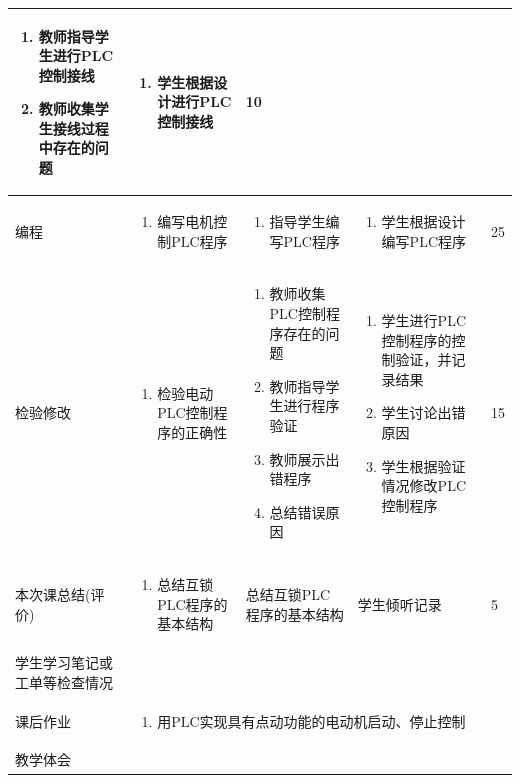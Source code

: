 {\begin{landscape}
\begin{longtable}{|m{10mm}|m{50mm}|m{50mm}|m{50mm}|m{15mm}|}
\begin{enumerate}
\item 教师指导学生进行PLC控制接线
\item 教师收集学生接线过程中存在的问题
\end{enumerate} &\begin{enumerate}
\item 学生根据设计进行PLC控制接线
\end{enumerate} &10 \\\hline
编程&
\begin{enumerate}
\item 编写电机控制PLC程序
\end{enumerate} &\begin{enumerate}
\item 指导学生编写PLC程序
\end{enumerate} &\begin{enumerate}
\item 学生根据设计编写PLC程序
\end{enumerate} &25 \\\hline
\centering 检验修改&\begin{enumerate}
\item 检验电动PLC控制程序的正确性
\end{enumerate}&\begin{enumerate}
\item 教师收集PLC控制程序存在的问题
\item 教师指导学生进行程序验证
\item 教师展示出错程序
\item 总结错误原因
\end{enumerate}&\begin{enumerate}
\item 学生进行PLC控制程序的控制验证，并记录结果
\item 学生讨论出错原因
\item 学生根据验证情况修改PLC控制程序
\end{enumerate}&15 \\\hline
\centering 本次课总结(评价)&\begin{enumerate}
\item 总结互锁PLC程序的基本结构 
\end{enumerate}&总结互锁PLC程序的基本结构  &学生倾听记录 &5 \\\hline
\centering 学生学习笔记或工单等检查情况&\multicolumn{4}{m{165mm}|}{\quad}\\\hline
\centering 课后作业&\multicolumn{4}{m{165mm}|}{\begin{enumerate}
\item 用PLC实现具有点动功能的电动机启动、停止控制
\end{enumerate}}\\\hline
\centering 教学体会&\multicolumn{4}{m{165mm}|}{\quad}\\
\end{longtable}


\end{landscape}}
